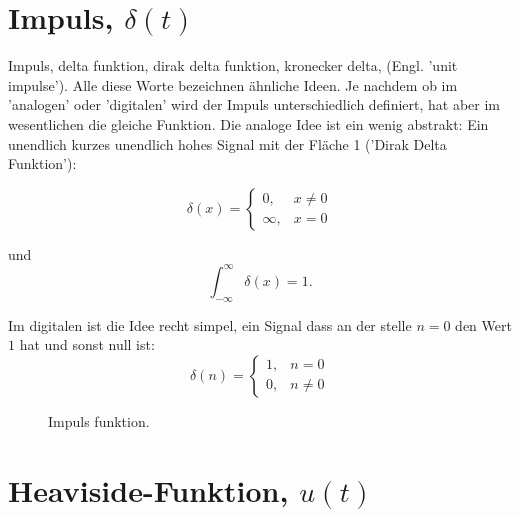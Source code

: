 \section{Impuls, $\delta(t)$}
Impuls, delta funktion, dirak delta funktion, kronecker delta, (Engl. 'unit impulse'). Alle diese Worte bezeichnen ähnliche Ideen. Je nachdem ob im 'analogen' oder 'digitalen' wird der Impuls unterschiedlich definiert, hat aber im wesentlichen die gleiche Funktion. Die analoge Idee ist ein wenig abstrakt: Ein unendlich kurzes unendlich hohes Signal mit der Fläche 1 ('Dirak Delta Funktion'):

\begin{equation}
 \delta (x)={\begin{cases}0,&x\neq 0\\{\infty },&x=0\end{cases}}
\end{equation}

und 
\begin{equation}
\int _{-\infty }^{\infty }\delta (x)=1.
\end{equation}


Im digitalen ist die Idee recht simpel, ein Signal dass an der stelle $n=0$ den Wert $1$ hat und sonst null ist:
\begin{equation}
	\delta(n) =
	\begin{cases} 
		1, & n = 0 \\ 
		0, &  n \neq 0 
\end{cases}
\end{equation}

% 	


\begin{figure}[H]
    \centering
    \subfigure[Impuls]{
        
        \label{fig:delta}
    }
    \caption{Impuls funktion.}
    \label{fig:deltaVersions}
\end{figure}



\section{Heaviside-Funktion, $u(t)$}

